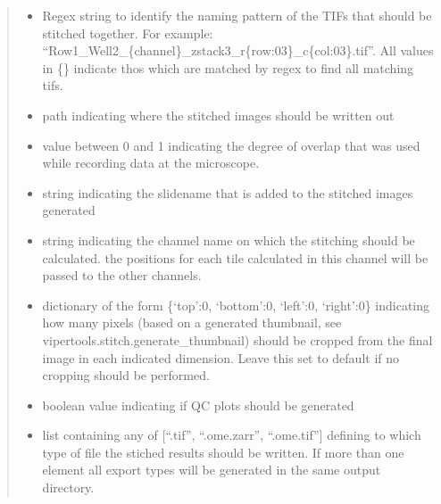 \documentclass[a4paper,10pt,english,openany,oneside]{sphinxmanual}
\begin{document}
\begin{fulllineitems}
\begin{quote}
\begin{description}
\begin{itemize}
\item {} 
\sphinxAtStartPar
{} \textendash{} Regex string to identify the naming pattern of the TIFs that should be stitched together.
For example: “Row1\_Well2\_\{channel\}\_zstack3\_r\{row:03\}\_c\{col:03\}.tif”.
All values in \{\} indicate thos which are matched by regex to find all matching tifs.

\item {} 
\sphinxAtStartPar
{} \textendash{} path indicating where the stitched images should be written out

\item {} 
\sphinxAtStartPar
{} \textendash{} value between 0 and 1 indicating the degree of overlap that was used while recording data at the microscope.

\item {} 
\sphinxAtStartPar
{} \textendash{} string indicating the slidename that is added to the stitched images generated

\item {} 
\sphinxAtStartPar
{} \textendash{} string indicating the channel name on which the stitching should be calculated. the positions for each tile calculated in this channel will be
passed to the other channels.

\item {} 
\sphinxAtStartPar
{} \textendash{} dictionary of the form \{‘top’:0, ‘bottom’:0, ‘left’:0, ‘right’:0\} indicating how many pixels (based on a generated thumbnail,
see vipertools.stitch.generate\_thumbnail) should be cropped from the final image in each indicated dimension. Leave this set to default
if no cropping should be performed.

\item {} 
\sphinxAtStartPar
{} \textendash{} boolean value indicating if QC plots should be generated

\item {} 
\sphinxAtStartPar
{} \textendash{} list containing any of {[}“.tif”, “.ome.zarr”, “.ome.tif”{]} defining to which type of file the stiched results should be written. If more than one
element all export types will be generated in the same output directory.


\end{itemize}
\end{description}
\end{quote}
\end{fulllineitems}
\end{document}
